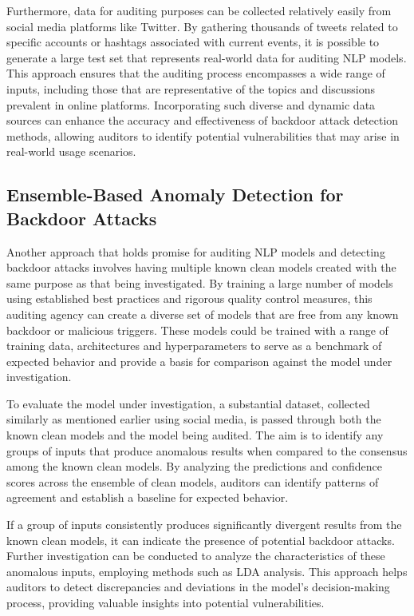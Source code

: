 Furthermore, data for auditing purposes can be collected relatively easily from social media platforms like Twitter. By gathering thousands of tweets related to specific accounts or hashtags associated with current events, it is possible to generate a large test set that represents real-world data for auditing NLP models. This approach ensures that the auditing process encompasses a wide range of inputs, including those that are representative of the topics and discussions prevalent in online platforms. Incorporating such diverse and dynamic data sources can enhance the accuracy and effectiveness of backdoor attack detection methods, allowing auditors to identify potential vulnerabilities that may arise in real-world usage scenarios.

\subsection{Ensemble-Based Anomaly Detection for Backdoor Attacks}

Another approach that holds promise for auditing NLP models and detecting backdoor attacks involves having multiple known clean models created with the same purpose as that being investigated. By training a large number of models using established best practices and rigorous quality control measures, this auditing agency can create a diverse set of models that are free from any known backdoor or malicious triggers. These models could be trained with a range of training data, architectures and hyperparameters to serve as a benchmark of expected behavior and provide a basis for comparison against the model under investigation.

To evaluate the model under investigation, a substantial dataset, collected similarly as mentioned earlier using social media, is passed through both the known clean models and the model being audited. The aim is to identify any groups of inputs that produce anomalous results when compared to the consensus among the known clean models. By analyzing the predictions and confidence scores across the ensemble of clean models, auditors can identify patterns of agreement and establish a baseline for expected behavior.

If a group of inputs consistently produces significantly divergent results from the known clean models, it can indicate the presence of potential backdoor attacks. Further investigation can be conducted to analyze the characteristics of these anomalous inputs, employing methods such as LDA analysis. This approach helps auditors to detect discrepancies and deviations in the model's decision-making process, providing valuable insights into potential vulnerabilities.

